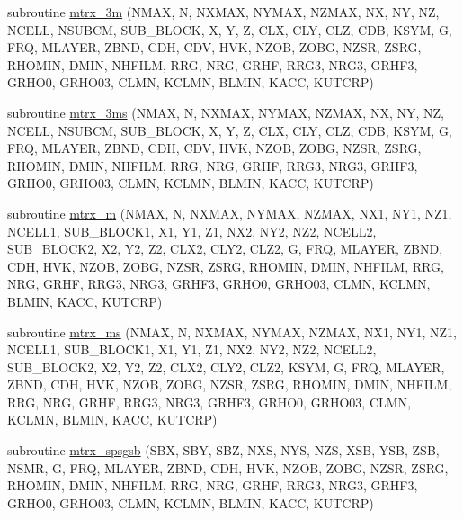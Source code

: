 \begin{DoxyCompactItemize}
\item 
subroutine \hyperlink{Marco_8f90_a9ccd53c7c6196e0d50a6db7a06d1c4e5}{mtrx\+\_\+3m} (N\+M\+AX, N, N\+X\+M\+AX, N\+Y\+M\+AX, N\+Z\+M\+AX, NX, NY, NZ, N\+C\+E\+LL, N\+S\+U\+B\+CM, S\+U\+B\+\_\+\+B\+L\+O\+CK, X, Y, Z, C\+LX, C\+LY, C\+LZ, C\+DB, K\+S\+YM, G, F\+RQ, M\+L\+A\+Y\+ER, Z\+B\+ND, C\+DH, C\+DV, H\+VK, N\+Z\+OB, Z\+O\+BG, N\+Z\+SR, Z\+S\+RG, R\+H\+O\+M\+IN, D\+M\+IN, N\+H\+F\+I\+LM, R\+RG, N\+RG, G\+R\+HF, R\+R\+G3, N\+R\+G3, G\+R\+H\+F3, G\+R\+H\+O0, G\+R\+H\+O03, C\+L\+MN, K\+C\+L\+MN, B\+L\+M\+IN, K\+A\+CC, K\+U\+T\+C\+RP)
\item 
subroutine \hyperlink{Marco_8f90_ae8f6d0ec346f13094a0e373aab8dd10d}{mtrx\+\_\+3ms} (N\+M\+AX, N, N\+X\+M\+AX, N\+Y\+M\+AX, N\+Z\+M\+AX, NX, NY, NZ, N\+C\+E\+LL, N\+S\+U\+B\+CM, S\+U\+B\+\_\+\+B\+L\+O\+CK, X, Y, Z, C\+LX, C\+LY, C\+LZ, C\+DB, K\+S\+YM, G, F\+RQ, M\+L\+A\+Y\+ER, Z\+B\+ND, C\+DH, C\+DV, H\+VK, N\+Z\+OB, Z\+O\+BG, N\+Z\+SR, Z\+S\+RG, R\+H\+O\+M\+IN, D\+M\+IN, N\+H\+F\+I\+LM, R\+RG, N\+RG, G\+R\+HF, R\+R\+G3, N\+R\+G3, G\+R\+H\+F3, G\+R\+H\+O0, G\+R\+H\+O03, C\+L\+MN, K\+C\+L\+MN, B\+L\+M\+IN, K\+A\+CC, K\+U\+T\+C\+RP)
\item 
subroutine \hyperlink{Marco_8f90_a1a5af411215f6aafd8701c9d0a5841ab}{mtrx\+\_\+m} (N\+M\+AX, N, N\+X\+M\+AX, N\+Y\+M\+AX, N\+Z\+M\+AX, N\+X1, N\+Y1, N\+Z1, N\+C\+E\+L\+L1, S\+U\+B\+\_\+\+B\+L\+O\+C\+K1, X1, Y1, Z1, N\+X2, N\+Y2, N\+Z2, N\+C\+E\+L\+L2, S\+U\+B\+\_\+\+B\+L\+O\+C\+K2, X2, Y2, Z2, C\+L\+X2, C\+L\+Y2, C\+L\+Z2, G, F\+RQ, M\+L\+A\+Y\+ER, Z\+B\+ND, C\+DH, H\+VK, N\+Z\+OB, Z\+O\+BG, N\+Z\+SR, Z\+S\+RG, R\+H\+O\+M\+IN, D\+M\+IN, N\+H\+F\+I\+LM, R\+RG, N\+RG, G\+R\+HF, R\+R\+G3, N\+R\+G3, G\+R\+H\+F3, G\+R\+H\+O0, G\+R\+H\+O03, C\+L\+MN, K\+C\+L\+MN, B\+L\+M\+IN, K\+A\+CC, K\+U\+T\+C\+RP)
\item 
subroutine \hyperlink{Marco_8f90_acd41ae7686429d1720e6242646b50bc1}{mtrx\+\_\+ms} (N\+M\+AX, N, N\+X\+M\+AX, N\+Y\+M\+AX, N\+Z\+M\+AX, N\+X1, N\+Y1, N\+Z1, N\+C\+E\+L\+L1, S\+U\+B\+\_\+\+B\+L\+O\+C\+K1, X1, Y1, Z1, N\+X2, N\+Y2, N\+Z2, N\+C\+E\+L\+L2, S\+U\+B\+\_\+\+B\+L\+O\+C\+K2, X2, Y2, Z2, C\+L\+X2, C\+L\+Y2, C\+L\+Z2, K\+S\+YM, G, F\+RQ, M\+L\+A\+Y\+ER, Z\+B\+ND, C\+DH, H\+VK, N\+Z\+OB, Z\+O\+BG, N\+Z\+SR, Z\+S\+RG, R\+H\+O\+M\+IN, D\+M\+IN, N\+H\+F\+I\+LM, R\+RG, N\+RG, G\+R\+HF, R\+R\+G3, N\+R\+G3, G\+R\+H\+F3, G\+R\+H\+O0, G\+R\+H\+O03, C\+L\+MN, K\+C\+L\+MN, B\+L\+M\+IN, K\+A\+CC, K\+U\+T\+C\+RP)
\item 
subroutine \hyperlink{Marco_8f90_a1c4fe90d64ccbd00c0df9a4f3544a6c8}{mtrx\+\_\+spsgsb} (S\+BX, S\+BY, S\+BZ, N\+XS, N\+YS, N\+ZS, X\+SB, Y\+SB, Z\+SB, N\+S\+MR, G, F\+RQ, M\+L\+A\+Y\+ER, Z\+B\+ND, C\+DH, H\+VK, N\+Z\+OB, Z\+O\+BG, N\+Z\+SR, Z\+S\+RG, R\+H\+O\+M\+IN, D\+M\+IN, N\+H\+F\+I\+LM, R\+RG, N\+RG, G\+R\+HF, R\+R\+G3, N\+R\+G3, G\+R\+H\+F3, G\+R\+H\+O0, G\+R\+H\+O03, C\+L\+MN, K\+C\+L\+MN, B\+L\+M\+IN, K\+A\+CC, K\+U\+T\+C\+RP)

\end{DoxyCompactItemize}
